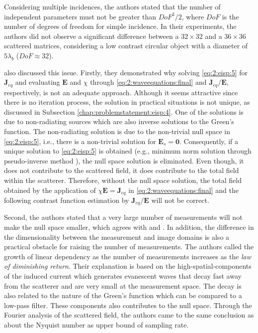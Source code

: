 			Considering multiple incidences, the authors stated that the number of independent parameters must not be greater than $DoF^2/2$, where $DoF$ is the number of degrees of freedom for simple incidence. In their experiments, the authors did not observe a significant difference between a $32\times32$ and a $36\times36$ scattered matrices, considering a low contrast circular object with a diameter of $5\lambda_b$ ($DoF\approx32$).
			
			 \cite{chew1994inverse} also discussed this issue. Firstly, they demonstrated why solving \eqref{eq:2:eisp:5} for $\mathbf{J}_{eq}$ and evaluating $\mathbf{E}$ and $\chi$ through \eqref{eq:2:waveequations:final} and $\mathbf{J}_{eq}/\mathbf{E}$, respectively, is not an adequate approach. Although it seems attractive since there is no iteration process, the solution in practical situations is not unique, as discussed in Subsection \ref{chap:problemstatement:eisp:4}. One of the solutions is due to non-radiating sources which are also inverse solutions to the Green's function. The non-radiating solution is due to the non-trivial null space in \eqref{eq:2:eisp:5}, i.e., there is a non-trivial solution for $\mathbf{E}_s=\mathbf{0}$. Consequently, if a unique solution to \eqref{eq:2:eisp:5} is obtained (e.g., minimum norm solution through pseudo-inverse method \citep{ney1984solution}), the null space solution is eliminated. Even though, it does not contribute to the scattered field, it does contribute to the total field within the scatterer. Therefore, without the null space solution, the total field obtained by the application of $\chi\mathbf{E}=\mathbf{J}_{eq}$ in \eqref{eq:2:waveequations:final} and the following contrast function estimation by $\mathbf{J}_{eq}/\mathbf{E}$ will not be correct.
			
			Second, the authors stated that a very large number of measurements will not make the null space smaller, which agrees with \cite{bucci1989degrees} and  \cite{bucci1997electromagnetic}. In addition, the difference in the dimensionality between the measurement and image domains is also a practical obstacle for raising the number of measurements. The authors called the growth of linear dependency as the number of measurements increases as the \textit{law of diminishing return}. Their explanation is based on the high-spatial-components of the induced current which generates evanescent waves that decay fast away from the scatterer and are very small at the measurement space. The decay is also related to the nature of the Green's function which can be compared to a low-pass filter. These components also contributes to the null space. Through the Fourier analysis of the scattered field, the authors came to the same conclusion as \cite{bucci1989degrees} about the Nyquist number as upper bound of sampling rate.
			
